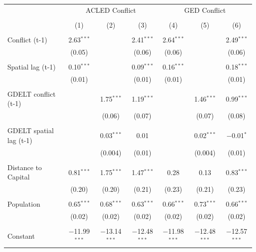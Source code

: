 \documentclass[hidelinks]{article}
\begin{document}
\begin{table}[!htbp] \centering 
\begin{footnotesize}
  \begin{tabular}{@{\extracolsep{5pt}}lcccccc} 
\cline{2-7} 
\\[-1.8ex] & \multicolumn{3}{c}{ACLED Conflict} & \multicolumn{3}{c}{GED Conflict} \\ 
\\[-1.8ex] & (1) & (2) & (3) & (4) & (5) & (6)\\ 
\hline \\[-1.8ex] 
 Conflict (t-1) & 2.63$^{***}$ &  & 2.41$^{***}$ & 2.64$^{***}$ &  & 2.49$^{***}$ \\ 
  & (0.05) &  & (0.06) & (0.06) &  & (0.06) \\ 
  & & & & & & \\ 
 Spatial lag (t-1) & 0.10$^{***}$ &  & 0.09$^{***}$& 0.16$^{***}$ &  & 0.18$^{***}$ \\ 
  & (0.01) &  & (0.01) & (0.01) &  & (0.01) \\ 
  & & & & & & \\ 
  GDELT conflict (t-1) &  & 1.75$^{***}$ & 1.19$^{***}$ &  & 1.46$^{***}$ & 0.99$^{***}$ \\ 
  &  & (0.06) & (0.07) &  & (0.07) & (0.08) \\ 
  & & & & & & \\ 
 GDELT spatial lag (t-1) &  & 0.03$^{***}$ & 0.01 &  & 0.02$^{***}$ & $-$0.01$^{*}$ \\ 
  &  & (0.004) & (0.01) &  & (0.004) & (0.01) \\ 
  & & & & & & \\ 
  Distance to Capital & 0.81$^{***}$ & 1.75$^{***}$ & 1.47$^{***}$ & 0.28 & 0.13 & 0.83$^{***}$ \\ 
  & (0.20) & (0.20) & (0.21) & (0.23) & (0.21) & (0.23) \\ 
  & & & & & & \\ 
  Population & 0.65$^{***}$ & 0.68$^{***}$ & 0.63$^{***}$ & 0.66$^{***}$ & 0.73$^{***}$ & 0.66$^{***}$ \\ 
  & (0.02) & (0.02) & (0.02) & (0.02) & (0.02) & (0.02) \\ 
  & & & & & & \\ 
 Constant & $-$11.99$^{***}$ & $-$13.14$^{***}$ & $-$12.48$^{***}$ & $-$11.98$^{***}$ & $-$12.48$^{***}$ & $-$12.57$^{***}$ \\ 

\end{tabular}
\end{footnotesize}
\end{table}
\end{document}
